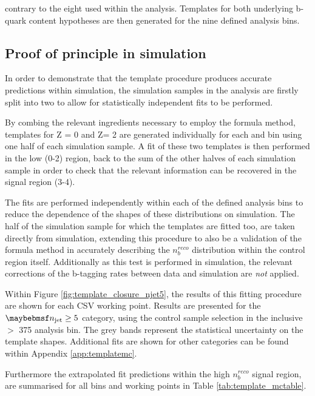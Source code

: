 contrary to the eight used within the \alphat analysis. Templates for both underlying b-quark content hypotheses are then generated for the nine defined analysis bins.

\subsection{Proof of principle in simulation}
\label{subsec:templateclosuretest}

In order to demonstrate that the template procedure produces accurate predictions within simulation, the simulation samples in the analysis are firstly split into two to allow for statistically independent fits to be performed. 

By combing the relevant ingredients necessary to employ the formula method, \nbreco templates for Z = 0 and Z= 2 are generated individually for each \njet and \theht bin using one half of each simulation sample. A fit of these two templates is then performed in the low \nbreco (0-2) region, back to the sum of the other halves of each simulation sample in order to check that the relevant information can be recovered in the \nbreco signal region (3-4).

The fits are performed independently within each of the defined analysis bins to reduce the dependence of the shapes of these distributions on simulation. The half of the simulation sample for which the templates are fitted too, are taken directly from simulation, extending this procedure to also be a validation of the formula method in accurately describing the $n_{b}^{reco}$ distribution within the control region itself. Additionally as this test is performed in simulation, the relevant corrections of the b-tagging rates between data and simulation are \emph{not} applied.  

Within Figure \ref{fig:template_closure_njet5}, the results of this fitting procedure are shown for each \ac{CSV} working point. Results are presented for the $\njet \geq 5$ category, using the \mupjets control sample selection in the inclusive \theht$>$ 375 \GeV analysis bin. The grey bands represent the statistical uncertainty on the template shapes. Additional fits are shown for other \njet categories can be found within Appendix \ref{app:templatemc}. 

Furthermore the extrapolated fit predictions within the high $n_{b}^{reco}$ signal region, are summarised for all \theht bins and working points in Table \ref{tab:template_mctable}. 

